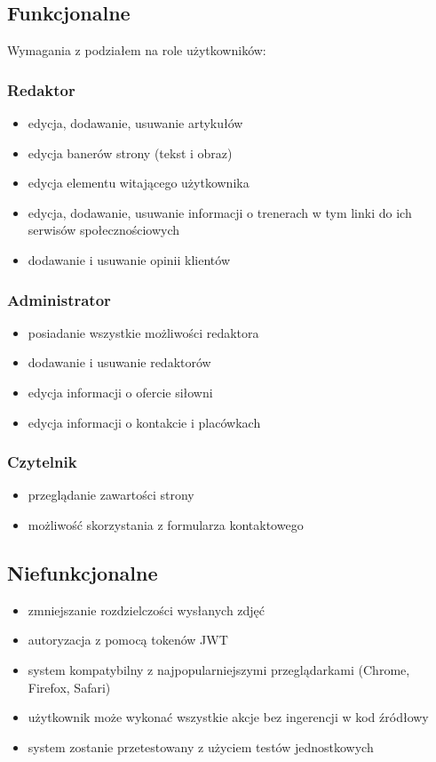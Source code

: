\documentclass[12pt]{article}
\begin{document}
\subsection{Funkcjonalne}
Wymagania z podziałem na role użytkowników:
\subsubsection{Redaktor}
\begin{itemize}
\item edycja, dodawanie, usuwanie artykułów
\item edycja banerów strony (tekst i obraz)
\item edycja elementu witającego użytkownika
\item edycja, dodawanie, usuwanie informacji o trenerach w tym linki do ich serwisów społecznościowych
\item dodawanie i usuwanie opinii klientów
\end{itemize}
\subsubsection{Administrator}
\begin{itemize}
\item posiadanie wszystkie możliwości redaktora
\item dodawanie i usuwanie redaktorów
\item edycja informacji o ofercie siłowni
\item edycja informacji o kontakcie i placówkach
\end{itemize}
\subsubsection{Czytelnik}
\begin{itemize}
\item przeglądanie zawartości strony
\item możliwość skorzystania z formularza kontaktowego
\end{itemize}
\subsection{Niefunkcjonalne}
\begin{itemize}
\item zmniejszanie rozdzielczości wysłanych zdjęć
\item autoryzacja z pomocą tokenów JWT
\item system kompatybilny z najpopularniejszymi przeglądarkami (Chrome, Firefox, Safari)
\item użytkownik może wykonać wszystkie akcje bez ingerencji w kod źródłowy
\item system zostanie przetestowany z użyciem testów jednostkowych
\end{itemize}
\end{document}
